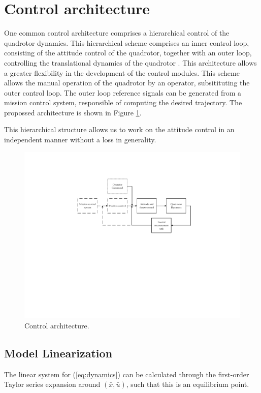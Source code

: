 \documentclass[12pt]{article}
\begin{document}
\section{Control architecture}
One common control architecture comprises a hierarchical control of the quadrotor dynamics. This hierarchical scheme comprises an inner control loop, consisting of the attitude control of the quadrotor, together with an outer loop, controlling the translational dynamics of the quadrotor \cite{Raff10}. This architecture allows a greater flexibility in the development of the control modules. This scheme allows the manual operation of the quadrotor by an operator, subsitituting the outer control loop. The outer loop reference signals can be generated from a mission control system, responsible of computing the desired trajectory. The propossed architecture is shown in Figure \ref{fig:control}.

This hierarchical structure allows us to work on the attitude control in an independent manner without a loss in generality.

\begin{figure}
  \centering
  \includegraphics{control.pdf}
  \caption{Control architecture.}
  \label{fig:control}
\end{figure}

\subsection{Model Linearization}
\label{sec:linearization}
The linear system for (\ref{eq:dynamics}) can be calculated through the first-order Taylor series expansion around $\left (\bar{x},\bar{u} \right )$, such that this is an equilibrium point.
\end{document}
